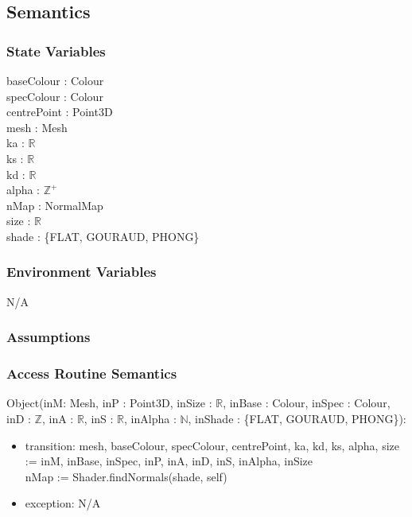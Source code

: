 \documentclass[12pt, titlepage]{article}
\begin{document}
\subsection{Semantics}
\subsubsection{State Variables}
baseColour : Colour \\
specColour : Colour \\
centrePoint : Point3D \\
mesh : Mesh \\ 
ka : $\mathbb{R}$ \\
ks : $\mathbb{R}$ \\
kd : $\mathbb{R}$ \\
alpha : $\mathbb{Z}^+$ \\
nMap : NormalMap \\
size : $\mathbb{R}$\\
shade : \{FLAT, GOURAUD, PHONG\}

\subsubsection{Environment Variables}
N/A

\subsubsection{Assumptions}

\subsubsection{Access Routine Semantics}
\noindent Object(inM: Mesh, inP : Point3D, inSize : 
$\mathbb{R}$,  inBase : Colour, inSpec : Colour, inD : $\mathbb{Z}$, inA : 
$\mathbb{R}$, inS : $\mathbb{R}$, inAlpha : $\mathbb{N}$, inShade : \{FLAT, 
GOURAUD, PHONG\}):
\begin{itemize}
	\item transition: mesh, baseColour, specColour, centrePoint, ka, kd, ks, 
	alpha, size := inM, inBase, inSpec, inP, inA, inD, inS, inAlpha, inSize\\
	nMap := Shader.findNormals(shade, self)
	\item exception: N/A
\end{itemize}
\end{document}
